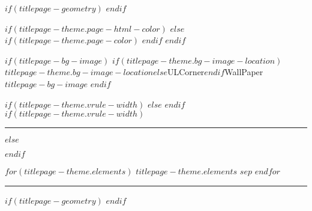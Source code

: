 \newcommand{\headerblock}{
$if(titlepage-header)$
{\titlepageheaderalign
\titlepageheaderfont
{\noindent $titlepage-header$}\\
}
\newlength{\afterheader}
\setlength{\afterheader}{$if(titlepage-theme.header-space-after)$$titlepage-theme.header-space-after$$else$0pt$endif$}

\vspace{\afterheader}
$else$$endif$
}

$if(titlepage-geometry)$
$endif$

$if(titlepage-theme.page-html-color)$
\pagecolor{pgcolor}\afterpage{\nopagecolor}
$else$
$if(titlepage-theme.page-color)$
\pagecolor{pgcolor}\afterpage{\nopagecolor}
$endif$
$endif$

$if(titlepage-bg-image)$
\newlength{\bgimagesize}
\setlength{\bgimagesize}{$if(titlepage-theme.bg-image-size)$$titlepage-theme.bg-image-size$$else$\paperwidth$endif$}
\LENGTHDIVIDE{\bgimagesize}{\paperwidth}{\theRatio} %
\This$if(titlepage-theme.bg-image-location)$$titlepage-theme.bg-image-location$$else$ULCorner$endif$WallPaper{\theRatio}{$titlepage-bg-image$}
$endif$

\thispagestyle{empty} %

$if(titlepage-theme.vrule-width)$
\newlength{\A}
\setlength{\A}{$titlepage-theme.vrule-width$}
\newlength{\B}
\setlength{\B}{\ifdim\A > 0pt $titlepage-theme.vrule-space$\else 0pt\fi}
\newlength{\minipagewidth}
{%
\setlength{\minipagewidth}{\textwidth - \A - \B - 0.1\textwidth}
}{
\setlength{\minipagewidth}{\textwidth - 2\A - 2\B - 0.1\textwidth}
}
$else$
\newlength{\minipagewidth}
\setlength{\minipagewidth}{\textwidth}
$endif$
$if(titlepage-theme.vrule-width)$
{%
\raggedleft %
\rule{\A}{\textheight} %
\hspace{\B} %
}{%
\raggedright}
$else$
\raggedright
$endif$
\begin{minipage}[b][\textheight][s]{\minipagewidth}
\titlepagepagealign
$for(titlepage-theme.elements)$
$titlepage-theme.elements$
$sep$
$endfor$
\end{minipage}

%
{%
\hspace{\B}
\rule{\A}{\textheight}
}{}
$if(titlepage-geometry)$
\restoregeometry
$endif$